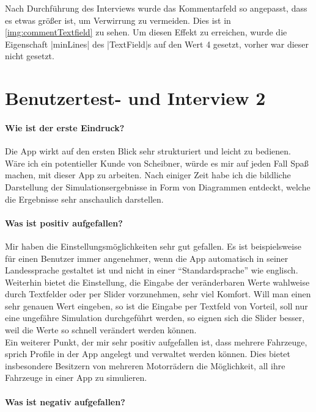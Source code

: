 	Nach Durchführung des Interviews wurde das Kommentarfeld so angepasst, dass es etwas größer ist, um Verwirrung zu vermeiden. Dies ist in \cref{img:commentTextfield} zu sehen. Um diesen Effekt zu erreichen, wurde die Eigenschaft |minLines| des |TextField|s auf den Wert 4 gesetzt, vorher war dieser nicht gesetzt.
	
	\section{Benutzertest- und Interview 2}
	\label{sec:flinterview2}
	
	\paragraph{Wie ist der erste Eindruck?}
	
		Die App wirkt auf den ersten Blick sehr strukturiert und leicht zu bedienen. Wäre ich ein potentieller Kunde von Scheibner, würde es mir auf jeden Fall Spaß machen, mit dieser App zu arbeiten. Nach einiger Zeit habe ich die bildliche Darstellung der Simulationsergebnisse in Form von Diagrammen entdeckt, welche die Ergebnisse sehr anschaulich darstellen.
	
	\paragraph{Was ist positiv aufgefallen?}
		
		Mir haben die Einstellungsmöglichkeiten sehr gut gefallen. Es ist beispielsweise für einen Benutzer immer angenehmer, wenn die App automatisch in seiner Landessprache gestaltet ist und nicht in einer ``Standardsprache'' wie englisch. Weiterhin bietet die Einstellung, die Eingabe der veränderbaren Werte wahlweise durch Textfelder oder per Slider vorzunehmen, sehr viel Komfort. Will man einen sehr genauen Wert eingeben, so ist die Eingabe per Textfeld von Vorteil, soll nur eine ungefähre Simulation durchgeführt werden, so eignen sich die Slider besser, weil die Werte so schnell verändert werden können.\\
		Ein weiterer Punkt, der mir sehr positiv aufgefallen ist, dass mehrere Fahrzeuge, sprich Profile in der App angelegt und verwaltet werden können. Dies bietet insbesondere Besitzern von mehreren Motorrädern die Möglichkeit, all ihre Fahrzeuge in einer App zu simulieren.
	
	\paragraph{Was ist negativ aufgefallen?}
	
